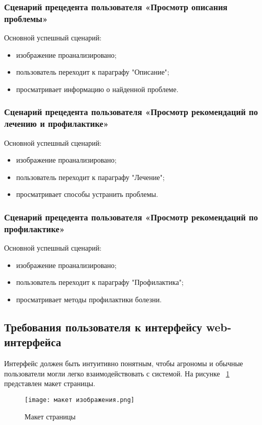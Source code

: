 \subsubsection{Сценарий прецедента пользователя «Просмотр описания проблемы»}
Основной успешный сценарий:
\begin{itemize}
	\item изображение проанализировано;
	\item пользователь переходит к параграфу "Описание";
	\item просматривает информацию о найденной проблеме.
\end{itemize}

\subsubsection{Сценарий прецедента пользователя «Просмотр рекомендаций по лечению и профилактике»}
Основной успешный сценарий:
\begin{itemize}
	\item изображение проанализировано;
	\item пользователь переходит к параграфу "Лечение";
	\item просматривает способы устранить проблемы.
\end{itemize}

\subsubsection{Сценарий прецедента пользователя «Просмотр рекомендаций по профилактике»}
Основной успешный сценарий:
\begin{itemize}
	\item изображение проанализировано;
	\item пользователь переходит к параграфу "Профилактика";
	\item просматривает методы профилактики болезни.
\end{itemize}

\subsection{Требования пользователя к интерфейсу web-интерфейса}
Интерфейс должен быть интуитивно понятным, чтобы агрономы и обычные пользователи могли легко взаимодействовать с системой.
На рисунке ~\ref{maksite1:image} представлен макет страницы.

\begin{figure}[H]
	\centering
	\texttt{[image: макет изображения.png]}
	\caption{Макет страницы}
	\label{maksite1:image}
\end{figure}


